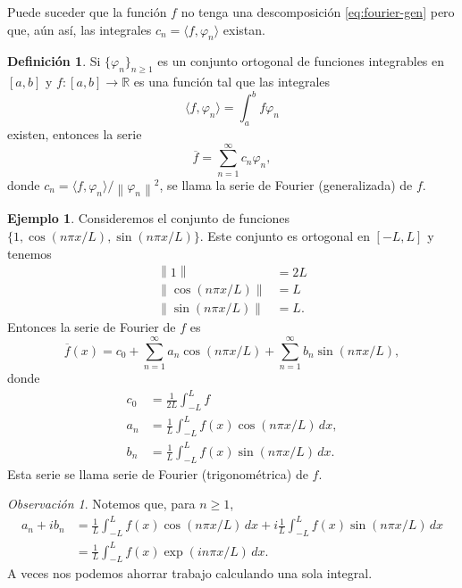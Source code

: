 \documentclass[11pt,letterpaper,draft]{report}
\theoremstyle{plain}
\theoremstyle{definition}
\newtheorem{definition}[theorem]{Definición}
\newtheorem{example}[theorem]{Ejemplo}
\theoremstyle{remark}
\newtheorem{remark}[theorem]{Observación}
\newcommand\R{\mathbb R}
\newcommand\norm[1]{\left\|#1\right\|}
\newcommand\<{\langle}
\renewcommand\>{\rangle}
\renewcommand\phi\varphi
\begin{document}
Puede suceder que la función $f$ no tenga una descomposición
\eqref{eq:fourier-gen} pero que, aún así,
las integrales $c_n=\<f,\phi_n\>$ existan.

\begin{definition}
  Si $\{\phi_n\}_{n\geq 1}$ es un conjunto ortogonal de funciones
  integrables en $[a,b]$ y $f:[a,b]\to\R$ es una función
  tal que las integrales
  \[
   \<f,\phi_n\> = \int_{a}^{b}f\phi_n
  \]
  existen, entonces la serie
  \[
    \overline{f}=\sum_{n=1}^{\infty}c_n\phi_n
  ,\]
  donde $c_n = \<f,\phi_n\>/\norm{\phi_n}^{2}$, se llama
  la serie de Fourier (generalizada) de $f$.
\end{definition}

\begin{example}
  Consideremos el conjunto de funciones
  $\{1,\cos(n\pi x/L),\sin(n\pi x/L)\}$.
  Este conjunto es ortogonal en $[-L,L]$ y tenemos
  \begin{align*}
    \norm{1} &= 2L \\
    \norm{\cos(n\pi x/L)} &= L \\
    \norm{\sin(n\pi x/L)} &= L.
  \end{align*}
  Entonces la serie de Fourier de $f$ es
  \begin{equation}\label{eq:serie-fourier}
    \overline{f}(x) = c_0
    + \sum_{n=1}^\infty a_n\cos(n\pi x/L)
    + \sum_{n=1}^\infty b_n\sin(n\pi x/L)
  ,
  \end{equation}
  donde
  \begin{align*}
    c_0 &= \frac{1}{2L}\int_{-L}^L f \\
    a_n &= \frac{1}{L}\int_{-L}^L f(x)\cos(n\pi x/L)\,dx, \\
    b_n &= \frac{1}{L}\int_{-L}^L f(x)\sin(n\pi x/L)\,dx.
  \end{align*}
  Esta serie se llama serie de Fourier (trigonométrica) de $f$.
\end{example}

\begin{remark}
Notemos que, para $n\geq 1$,
\begin{align*}
  a_n+ib_n
  &= \frac{1}{L}\int_{-L}^L f(x)\cos(n\pi x/L)\,dx
    + i\frac{1}{L}\int_{-L}^L f(x)\sin(n\pi x/L)\,dx \\
  &= \frac{1}{L}\int_{-L}^L f(x)\exp(in\pi x/L)\,dx.
\end{align*}
A veces nos podemos ahorrar trabajo calculando una sola integral.
\end{remark}
\end{document}
